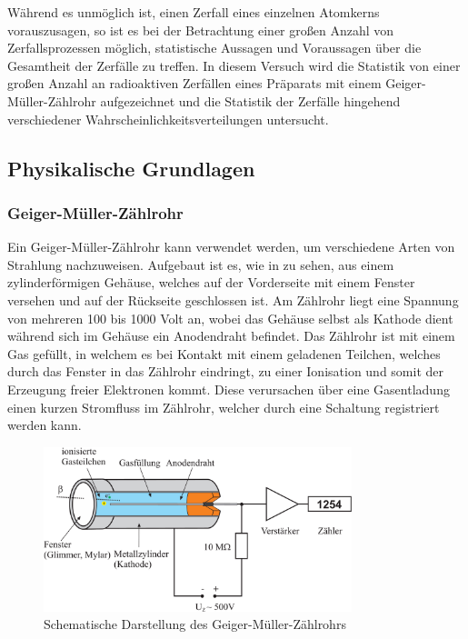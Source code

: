 Während es unmöglich ist, einen Zerfall eines einzelnen Atomkerns vorauszusagen, so ist es bei der Betrachtung einer großen Anzahl von Zerfallsprozessen möglich, statistische Aussagen und Voraussagen über die Gesamtheit der Zerfälle zu treffen. In diesem Versuch wird die Statistik von einer großen Anzahl an radioaktiven Zerfällen eines Präparats mit einem Geiger-Müller-Zählrohr aufgezeichnet und die Statistik der Zerfälle hingehend verschiedener Wahrscheinlichkeitsverteilungen untersucht.

\subsection{Physikalische Grundlagen}

\subsubsection*{Geiger-Müller-Zählrohr}

Ein Geiger-Müller-Zählrohr kann verwendet werden, um verschiedene Arten von Strahlung nachzuweisen. Aufgebaut ist es, wie in  zu sehen, aus einem zylinderförmigen Gehäuse, welches auf der Vorderseite mit einem Fenster versehen und auf der Rückseite geschlossen ist. Am Zählrohr liegt eine Spannung von mehreren 100 bis 1000 Volt an, wobei das Gehäuse selbst als Kathode dient während sich im Gehäuse ein Anodendraht befindet. Das Zählrohr ist mit einem Gas gefüllt, in welchem es bei Kontakt mit einem geladenen Teilchen, welches durch das Fenster in das Zählrohr eindringt, zu einer Ionisation und somit der Erzeugung freier Elektronen kommt. Diese verursachen über eine Gasentladung einen kurzen Stromfluss im Zählrohr, welcher durch eine Schaltung registriert werden kann. 

\begin{figure}[H]
  \centering
  \includegraphics[width=0.8\textwidth]{files/gm_zaehlrohr.png}
  \caption{Schematische Darstellung des Geiger-Müller-Zählrohrs}
  \label{fig:gm_zaehlrohr}
\end{figure}

